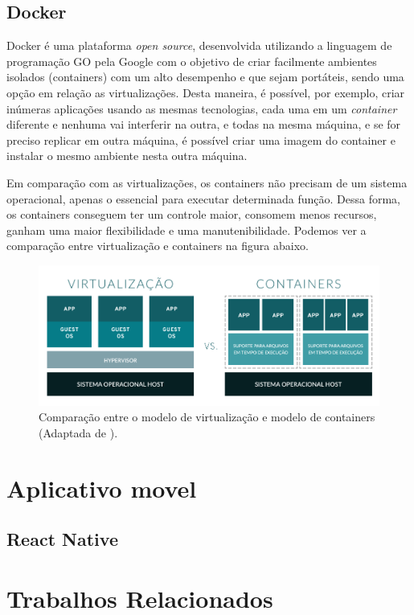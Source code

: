 \subsection{Docker}
\label{fund:docker}
Docker é uma plataforma \textit{open source}, desenvolvida utilizando a linguagem de programação GO pela Google com o objetivo de criar facilmente  ambientes isolados (containers) com um alto desempenho e que sejam portáteis, sendo uma opção em relação as virtualizações. Desta maneira, é possível, por exemplo, criar inúmeras aplicações usando as mesmas tecnologias, cada uma em um \textit{container} diferente e nenhuma vai interferir na outra, e todas na mesma máquina, e se for preciso replicar em outra máquina, é possível criar uma imagem do container e instalar o mesmo ambiente nesta outra máquina.

Em comparação com as virtualizações, os containers não precisam de um sistema operacional, apenas o essencial para executar determinada função. Dessa forma, os containers conseguem ter um controle maior, consomem menos recursos, ganham uma maior flexibilidade e uma manutenibilidade. Podemos ver a comparação entre virtualização e containers na figura abaixo.

\begin{figure}[!ht]
  \centering
  \includegraphics[width=.80\textwidth]{assets/virtualization-vs-containers.png} 
  \caption{Comparação entre o modelo de virtualização e modelo de containers (Adaptada de \cite{redhat2020Containers}).}
  \label{fig:virtualization-vs-containers}
\end{figure}


\section{Aplicativo movel}
\label{fund:app}

\subsection{React Native}
\label{fund:react-native}

\section{Trabalhos Relacionados}
\label{fund:trabalhos-relacionados}